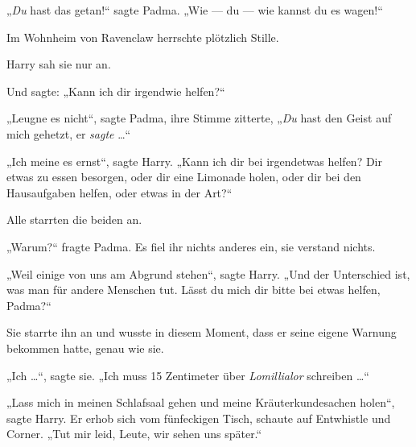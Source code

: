 „\emph{Du} hast das getan!“ sagte Padma.
„Wie — du — wie kannst du es wagen!“

Im Wohnheim von Ravenclaw herrschte plötzlich Stille.

Harry sah sie nur an.

Und sagte:
„Kann ich dir irgendwie helfen?“

„Leugne es nicht“, sagte Padma, ihre Stimme zitterte,
„\emph{Du} hast den Geist auf mich gehetzt, er \emph{sagte} …“

„Ich meine es ernst“, sagte Harry.
„Kann ich dir bei irgendetwas helfen? Dir etwas zu essen besorgen, oder dir eine Limonade holen, oder dir bei den Hausaufgaben helfen, oder etwas in der Art?“

Alle starrten die beiden an.

„Warum?“ fragte Padma. Es fiel ihr nichts anderes ein, sie verstand nichts.

„Weil einige von uns am Abgrund stehen“, sagte Harry.
„Und der Unterschied ist, was man für andere Menschen tut. Lässt du mich dir bitte bei etwas helfen, Padma?“

Sie starrte ihn an und wusste in diesem Moment, dass er seine eigene Warnung bekommen hatte, genau wie sie.

„Ich …“, sagte sie.
„Ich muss 15 Zentimeter über \emph{Lomillialor} schreiben …“

„Lass mich in meinen Schlafsaal gehen und meine Kräuterkundesachen holen“, sagte Harry. Er erhob sich vom fünfeckigen Tisch, schaute auf Entwhistle und Corner.
„Tut mir leid, Leute, wir sehen uns später.“

